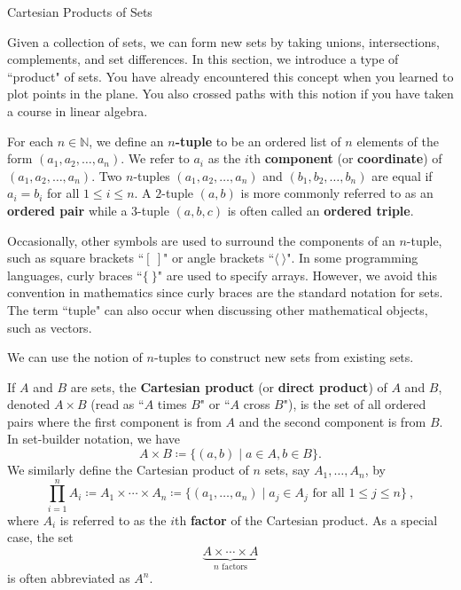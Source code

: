 \begin{section}{Cartesian Products of Sets}\label{sec:Cartesian Products}

Given a collection of sets, we can form new sets by taking unions, intersections, complements, and set differences.  In this section, we introduce a type of ``product" of sets.  You have already encountered this concept when you learned to plot points in the plane.  You also crossed paths with this notion if you have taken a course in linear algebra.

\begin{definition}
For each $n\in \mathbb{N}$, we define an \textbf{$n$-tuple} to be an ordered list of $n$ elements of the form $\boxed{(a_1, a_2,\ldots,a_n)}$. We refer to $a_i$ as the $i$th \textbf{component} (or \textbf{coordinate}) of $(a_1, a_2,\ldots,a_n)$. Two $n$-tuples $(a_1, a_2,\ldots,a_n)$ and $(b_1, b_2,\ldots,b_n)$ are equal if $a_i=b_i$ for all $1\leq i\leq n$. A $2$-tuple $(a,b)$ is more commonly referred to as an \textbf{ordered pair} while a $3$-tuple $(a,b,c)$ is often called an \textbf{ordered triple}.
\end{definition}

Occasionally, other symbols are used to surround the components of an $n$-tuple, such as square brackets ``$[\ ]$" or angle brackets ``$\langle\ \rangle$". In some programming languages, curly braces ``$\{\ \}$" are used to specify arrays. However, we avoid this convention in mathematics since curly braces are the standard notation for sets. The term ``tuple" can also occur when discussing other mathematical objects, such as vectors.

We can use the notion of $n$-tuples to construct new sets from existing sets.

\begin{definition}
If $A$ and $B$ are sets, the \textbf{Cartesian product} (or \textbf{direct product}) of $A$ and $B$, denoted $A\times B$ (read as ``$A$ times $B$" or ``$A$ cross $B$"), is the set of all ordered pairs where the first component is from $A$ and the second component is from $B$. In set-builder notation, we have
\[
\boxed{A\times B\coloneqq \{(a,b)\mid a\in A, b\in B\}}.
\]
We similarly define the Cartesian product of $n$ sets, say $A_1, \ldots, A_n$, by
\[
\boxed{\prod_{i=1}^{n} A_i\coloneqq A_1\times \cdots \times A_n\coloneqq \{(a_1,\ldots,a_n)\mid  a_j\in A_j \mbox{ for all }1\leq j\leq n\}}\ ,
\]
where $A_i$ is referred to as the $i$th \textbf{factor} of the Cartesian product. As a special case, the set 
\[
\underbrace{A\times \cdots \times A}_{n\text{ factors}}
\]
is often abbreviated as $A^n$.
\end{definition}


\end{section}
